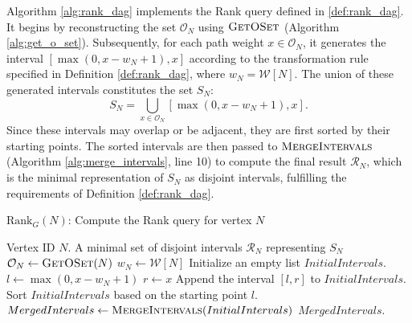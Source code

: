 
Algorithm \ref{alg:rank_dag} implements the Rank query defined in \ref{def:rank_dag}. It begins by reconstructing the set $\mathcal{O}_N$ using $\textsc{GetOSet}$ (Algorithm \ref{alg:get_o_set}). Subsequently, for each path weight $x \in \mathcal{O}_N$, it generates the interval $[\max(0, x - w_N + 1), x]$ according to the transformation rule specified in Definition \ref{def:rank_dag}, where $w_N = \mathcal{W}[N]$. The union of these generated intervals constitutes the set $S_N$:
\[ S_N = \bigcup_{x \in \mathcal{O}_N} [ \max(0, x - w_N + 1), x ]. \]
Since these intervals may overlap or be adjacent, they are first sorted by their starting points. The sorted intervals are then passed to $\textsc{MergeIntervals}$ (Algorithm \ref{alg:merge_intervals}, line 10) to compute the final result $\mathcal{R}_N$, which is the minimal representation of $S_N$ as disjoint intervals, fulfilling the requirements of Definition \ref{def:rank_dag}.

\begin{algorithm}
    \caption{$\mathrm{Rank}_G(N)$: Compute the Rank query for vertex $N$}
    \label{alg:rank_dag}
    \small
    \begin{algorithmic}[1]
        \Require Vertex ID $N$.
        \Ensure A minimal set of disjoint intervals $\mathcal{R}_N$ representing $S_N$
        \State $\mathcal{O}_N \gets \textsc{GetOSet}(N)$
        \State $w_N \gets \mathcal{W}[N]$
        \State Initialize an empty list $InitialIntervals$.
        \State $l \gets \max(0, x - w_N + 1)$
        \State $r \gets x$
        \State Append the interval $[l, r]$ to $InitialIntervals$.
        \EndFor
        \State Sort $InitialIntervals$ based on the starting point $l$.
        \State $MergedIntervals \gets \textsc{MergeIntervals}(InitialIntervals)$
        \State \Return $MergedIntervals$.
    \end{algorithmic}
\end{algorithm}


